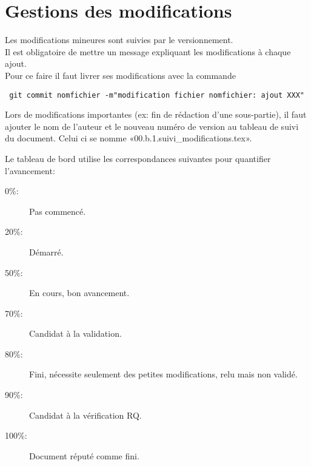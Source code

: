 \section{Gestions des modifications}

Les modifications mineures sont suivies par le versionnement.\\
Il est obligatoire de mettre un message
expliquant les modifications à chaque ajout.\\
Pour ce faire il faut livrer ses modifications avec la commande
\begin{verbatim}
 git commit nomfichier -m"modification fichier nomfichier: ajout XXX"
\end{verbatim}
Lors de modifications importantes (ex: fin de rédaction d'une
sous-partie), il faut ajouter le nom de l'auteur
et le nouveau numéro de version au tableau de suivi du document.
Celui ci se nomme «00.b.1.suivi\_modifications.tex».


Le tableau de bord utilise les correspondances suivantes pour quantifier
l'avancement:
\begin{description}
    \item[0\%:]  Pas commencé.
    \item[20\%:] Démarré.
    \item[50\%:] En cours, bon avancement.
    \item[70\%:] Candidat à la validation. 
    \item[80\%:] Fini, nécessite seulement des petites modifications,
                    relu mais non validé.
    \item[90\%:] Candidat à la vérification RQ. 
    \item[100\%:]Document réputé comme fini.
\end{description}
